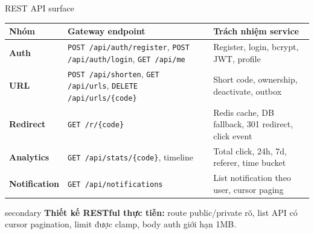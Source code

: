 \documentclass[aspectratio=169]{beamer}
\begin{document}
\begin{frame}{REST API surface}
    \scriptsize
    \begin{center}
    \begin{tabular}{>{\bfseries}p{}p{}p{}}
        \toprule
        Nhóm & Gateway endpoint & Trách nhiệm service \\
        \midrule
        Auth & \texttt{POST /api/auth/register}, \texttt{POST /api/auth/login}, \texttt{GET /api/me} & Register, login, bcrypt, JWT, profile \\
        URL & \texttt{POST /api/shorten}, \texttt{GET /api/urls}, \texttt{DELETE /api/urls/\{code\}} & Short code, ownership, deactivate, outbox \\
        Redirect & \texttt{GET /r/\{code\}} & Redis cache, DB fallback, 301 redirect, click event \\
        Analytics & \texttt{GET /api/stats/\{code\}}, timeline & Total click, 24h, 7d, referer, time bucket \\
        Notification & \texttt{GET /api/notifications} & List notification theo user, cursor paging \\
        \bottomrule
    \end{tabular}
    \end{center}
    \vspace{0.35cm}
    \begin{claimbox}{secondary}
        \small \textbf{Thiết kế RESTful thực tiễn:} route public/private rõ, list API có cursor pagination, limit được clamp, body auth giới hạn 1MB.
    \end{claimbox}
\end{frame}
\end{document}
